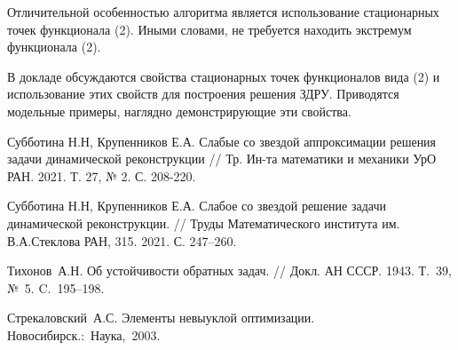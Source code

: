 Отличительной особенностью алгоритма является использование стационарных точек функционала (2). Иными словами, не требуется находить экстремум функционала (2).

В докладе обсуждаются свойства стационарных точек функционалов вида (2) и использование этих свойств для построения решения ЗДРУ. Приводятся модельные примеры, наглядно демонстрирующие эти свойства.

%

\begin{thebibliography}{9}

 Субботина Н.Н, Крупенников Е.А. Слабые со звездой аппроксимации решения задачи динамической реконструкции // Тр. Ин-та математики и механики УрО РАН. 2021. Т. 27, № 2. С. 208-220.

 Субботина Н.Н, Крупенников Е.А.  Слабое со звездой решение задачи динамической реконструкции. // Труды Математического института им. В.А.Стеклова РАН, 315. 2021. С. 247–260.

 Тихонов~А.Н. Об устойчивости обратных задач. // Докл. АН СССР. 1943. Т.~39, №~5. C.~195--198.

 Стрекаловский~А.С. Элементы невыуклой оптимизации. Новосибирск.:~Наука,~2003.

\end{thebibliography}





%

